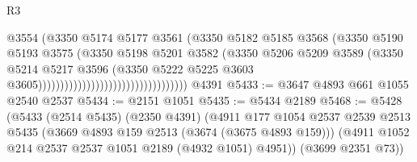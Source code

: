 \begin{lexlean}{R3}
\begin{coremodule}
                                                          @3554
                                                          (@3350
                                                            @5174
                                                            @5177
                                                            @3561
                                                            (@3350
                                                              @5182
                                                              @5185
                                                              @3568
                                                              (@3350
                                                                @5190
                                                                @5193
                                                                @3575
                                                                (@3350
                                                                  @5198
                                                                  @5201
                                                                  @3582
                                                                  (@3350
                                                                    @5206
                                                                    @5209
                                                                    @3589
                                                                    (@3350
                                                                      @5214
                                                                      @5217
                                                                      @3596
                                                                      (@3350
                                                                        @5222
                                                                        @5225
                                                                        @3603
                                                                        @3605))))))))))))))))))))))))))))))))))
    @4391
@5433 := @3647 @4893 @661 @1055 @2540 @2537
@5434 := @2151 @1051
@5435 := @5434 @2189
@5468 := @5428
    (@5433
      (@2514 @5435)
      (@2350 @4391)
      (@4911
        @177
        @1054
        @2537
        @2539
        @2513
        @5435
        (@3669 @4893 @159 @2513 (@3674 (@3675 @4893 @159)))
        (@4911 @1052 @214 @2537 @2537 @1051 @2189 (@4932 @1051) @4951))
      (@3699 @2351 @73))

\end{coremodule}
\end{lexlean}
